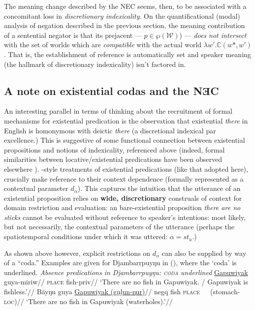 The meaning change described by the NEC seems, then, to be associated with a concomitant loss in \textit{discretionary indexicality}. On the quantificational (modal) analysis of negation described in the previous section, the meaning contribution of a sentential negator is that its prejacent --- $ p\in\wp(\mathcal W) $) --- \textit{does not intersect} with the set of worlds which are \textit{compatible} with the actual world $ \lambda w'.\mathbb C(w\!*,w') $. That is, the establishment of reference is automatically set and speaker meaning (the hallmark of discretionary indexicality) isn't factored in.


\label{disc-nec}
\subsection{A note on existential codas and the NƎC}

\label{codas}

An interesting parallel in terms of thinking about the recruitment of formal mechanisms for existential predication is the observation that existential \textit{there} in English is homonymous with deictic \textit{there} (a discretional indexical par excellence.) This is suggestive of some functional connection between existential propositions and notions of indexicality, referenced above (indeed, formal similarities between locative/existential predications have been observed elsewhere \citealp[\textit{e.g.,}][]{Freeze1992}). \citealt{Francez2007}-style treatments of existential predications (like that adopted here), crucially make reference to their context dependence (formally represented as a contextual parameter $d_\alpha$). This captures the intuition that the utterance of an existential proposition relies on \textbf{wide, discretionary} construals of context for domain restriction and evaluation: an bare-existential proposition \textit{there are no sticks} cannot be evaluated without reference to speaker's intentions: most likely, but not necessarily,  the contextual parameters of the utterance (perhaps the spatiotemporal conditions under which it was uttered: $ \alpha=\mathit{st_u} $.)

As shown above however, explicit restrictions on $d_\alpha$ can also be supplied by way of a ``coda.'' Examples are given for Djambarrpuyŋu in (\nextx), where the `coda' is underlined.
\pex\textit{Absence predications in Djambarrpuyŋu: \textsc{coda} underlined}
\a\begingl\gla \ul{Gapuwiyak} guya-miriw//
\glb \textsc{place} fish-\gls{priv}//
\glft`There are no fish in Gapuwiyak. / Gapuwiyak is fishless.'//\endgl
\a\begingl\gla Bäyŋu guya \ul{Gapuwiyak (guḻun-ŋur)}//
\glb  \gls{negq} fish \textsc{place}~~~(stomach-\textsc{loc})//
\glft`There are no fish in Gapuwiyak (waterholes).'//\endgl\xe

